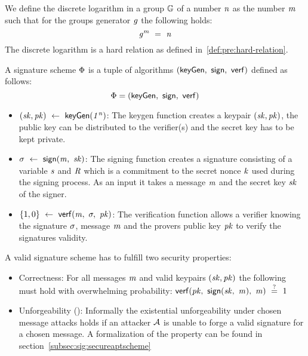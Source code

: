 \begin{definition}\label{def:pre:discretelog}
    We define the discrete logarithm in a group $\mathbb{G}$ of a number $\mathit{n}$ as the number $\mathit{m}$ such that for the groups generator $\mathit{g}$ the following holds:
    \[ \mathit{g}^{\mathit{m}} ~=~ \mathit{n} \]
    The discrete logarithm is a hard relation as defined in~\ref{def:pre:hard-relation}.
\end{definition}

\begin{definition}\label{def:pre:signature-scheme}
    A signature scheme $\Phi$ is a tuple of algorithms $(\mathsf{keyGen} ,~ \mathsf{sign} ,~ \mathsf{verf})$ defined as follows:~\cite{goldwasser1988digital}
    \[ \Phi = (\mathsf{keyGen} ,~ \mathsf{sign} ,~ \mathsf{verf}) \]

    \begin{itemize}
        \item $(\mathit{sk}, \mathit{pk}) ~\leftarrow~ \mathsf{keyGen}(\mathit{1^n})$: The keygen function creates a keypair $(\mathit{sk}, \mathit{pk})$, the public key can be distributed to the verifier(s) and the secret key has to be kept private. \\
        \item $\sigma ~\leftarrow~ \mathsf{sign}(\mathit{m} ,~ \mathit{sk})$: The signing function creates a signature consisting of a variable $\mathit{s}$ and $\mathit{R}$ which is a commitment to the secret nonce $\mathit{k}$ used during the signing process.
        As an input it takes a message $\mathit{m}$ and the secret key $\mathit{sk}$ of the signer.
        \item $\{1,0\} ~\leftarrow~ \mathsf{verf}(\mathit{m} ,~ \sigma ,~ \mathit{pk})$: The verification function allows a verifier knowing the signature $\sigma$, message $\mathit{m}$ and the provers public key $\mathit{pk}$ to verify the signatures
        validity. \\
    \end{itemize}

    A valid signature scheme has to fulfill two security properties:
    \begin{itemize}
        \item Correctness: For all messages $\mathit{m}$ and valid keypairs $(\mathit{sk}, \mathit{pk})$ the following must hold with overwhelming probability: $\mathsf{verf}(\mathit{pk} ,~ \mathsf{sign}(\mathit{sk} ,~ \mathit{m}) ,~ \mathit{m}) ~\stackrel{?}{=}~ 1$
        \item Unforgeability (\cnstEUFCMA): Informally the existential unforgeability under chosen message attacks holds if an attacker $\mathcal{A}$ is unable to forge a valid signature for a chosen message.
        A formalization of the property can be found in section~\ref{subsec:sig:secureaptscheme}
    \end{itemize}
\end{definition}


